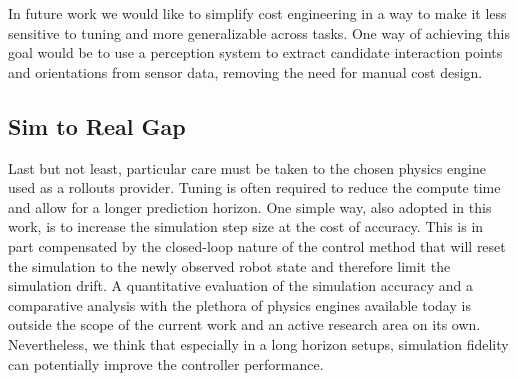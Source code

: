 In future work we would like to simplify cost engineering in a way to make it less sensitive to tuning and more generalizable across tasks. One way of achieving this goal would be to use a perception system to extract candidate interaction points and orientations from sensor data, removing the need for manual cost design. 

\subsection{Sim to Real Gap}
Last but not least, particular care must be taken to the chosen physics engine used as a rollouts provider. Tuning is often required to reduce the compute time and allow for a longer prediction horizon. One simple way, also adopted in this work, is to increase the simulation step size at the cost of accuracy. This is in part compensated by the closed-loop nature of the control method that will reset the simulation to the newly observed robot state and therefore limit the simulation drift. A quantitative evaluation of the simulation accuracy and a comparative analysis with the plethora of physics engines available today is outside the scope of the current work and an active research area on its own. Nevertheless, we think that especially in a long horizon setups, simulation fidelity can potentially improve the controller performance. 
